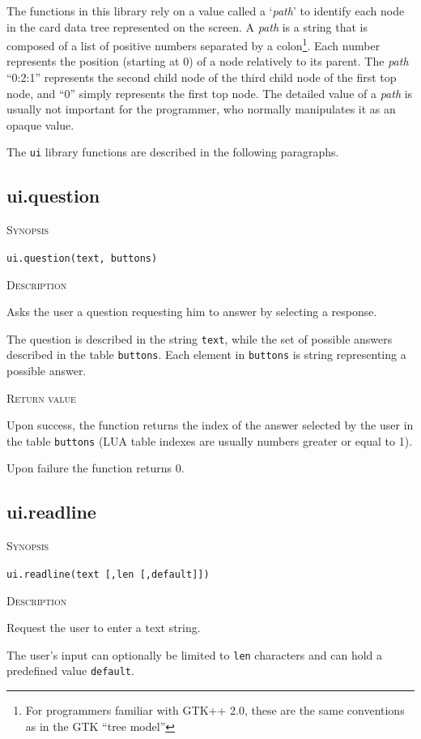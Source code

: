 \documentclass[11pt]{report}
\newcommand{\mansection}[1]{\vspace{0.5em}\par\noindent\textsc{#1}\vspace{0.5em}\par}
\newcommand{\syn}[1]{\texttt{#1}}
\begin{document}
The functions in this library rely on a value called a `\emph{path}' to identify 
each node in the card data tree represented on the screen.
A \emph{path} is a string that is composed of a list of positive numbers separated 
by a colon\footnote{For programmers familiar with GTK++ 2.0, these are the same 
conventions as in the GTK ``tree model''}. 
Each number represents the position (starting at 0) of a node relatively to its parent.
The \emph{path} ``0:2:1'' represents the second child node of the third child 
node of the first top node, and ``0'' simply represents the first top node.
The detailed value of a \emph{path} is usually not important for the programmer, 
who normally manipulates it as an opaque value. 

The \syn{ui} library functions are described in the following paragraphs.


\subsection{ui.question}

\mansection{Synopsis}
\syn{ui.question(text, buttons)}

\mansection{Description}
  Asks the user a question requesting him to answer by selecting a response.

  The question is described in the string \syn{text}, while the set of 
  possible answers described in the table \syn{buttons}. 
  Each element in \syn{buttons} is string representing a possible answer.
  
\mansection{Return value}
  Upon success, the function returns the index of the answer selected by the 
  user in the table \syn{buttons} 
  (LUA table indexes are usually numbers greater or equal to 1). 
  
  Upon failure the function returns 0.


\subsection{ui.readline}

\mansection{Synopsis}
\syn{ui.readline(text [,\syn{len} [,\syn{default}]])}

\mansection{Description}
  Request the user to enter a text string. 

  The user's input can optionally be limited to \syn{len} characters and 
  can hold a predefined value \syn{default}.
  
\end{document}
